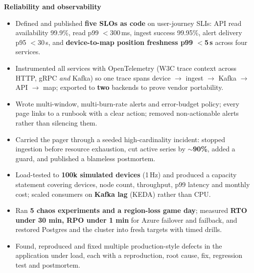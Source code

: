 \documentclass[10pt,letterpaper]{article}
\newcommand{\theme}[1]{\vspace{3pt}\textbf{\color{accent}#1}\par\vspace{-1pt}}
\begin{document}
\theme{Reliability and observability}
\begin{itemize}
  \item Defined and published \textbf{five SLOs as code} on user-journey SLIs: API read availability 99.9\%, read p99 $<$300\,ms, ingest success 99.95\%, alert delivery p95 $<$30\,s, and \textbf{device-to-map position freshness p99 $<$5\,s} across four services. %
  \item Instrumented all services with OpenTelemetry (W3C trace context across HTTP, gRPC \emph{and} Kafka) so one trace spans device $\rightarrow$ ingest $\rightarrow$ Kafka $\rightarrow$ API $\rightarrow$ map; exported to \textbf{two} backends to prove vendor portability. %
  \item Wrote multi-window, multi-burn-rate alerts and error-budget policy; every page links to a runbook with a clear action; removed non-actionable alerts rather than silencing them. %
  \item Carried the pager through a seeded high-cardinality incident: stopped ingestion before resource exhaustion, cut active series by \textbf{$\sim$90\%}, added a guard, and published a blameless postmortem. %
  \item Load-tested to \textbf{100k simulated devices} (1\,Hz) and produced a capacity statement covering devices, node count, throughput, p99 latency and monthly cost; scaled consumers on \textbf{Kafka lag} (KEDA) rather than CPU. %
  \item Ran \textbf{5 chaos experiments and a region-loss game day}; measured \textbf{RTO under 30 min, RPO under 1 min} for Azure failover and failback, and restored Postgres and the cluster into fresh targets with timed drills. %
  \item Found, reproduced and fixed multiple production-style defects in the application under load, each with a reproduction, root cause, fix, regression test and postmortem. %
\end{itemize}
\end{document}
